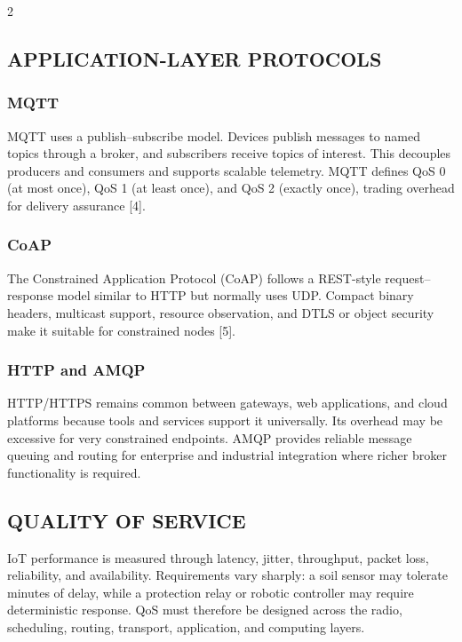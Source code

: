 \begin{multicols}{2}

  \subsection*{\centering\uppercase{Application-Layer Protocols}}
  \subsubsection*{MQTT}
  MQTT uses a publish--subscribe model. Devices publish messages to named topics through a broker, and subscribers receive topics of interest. This decouples producers and consumers and supports scalable telemetry. MQTT defines QoS 0 (at most once), QoS 1 (at least once), and QoS 2 (exactly once), trading overhead for delivery assurance [4].

  \subsubsection*{CoAP}
  The Constrained Application Protocol (CoAP) follows a REST-style request--response model similar to HTTP but normally uses UDP. Compact binary headers, multicast support, resource observation, and DTLS or object security make it suitable for constrained nodes [5].

  \subsubsection*{HTTP and AMQP}
  HTTP/HTTPS remains common between gateways, web applications, and cloud platforms because tools and services support it universally. Its overhead may be excessive for very constrained endpoints. AMQP provides reliable message queuing and routing for enterprise and industrial integration where richer broker functionality is required.

  \subsection*{\centering\uppercase{Quality of Service}}
  IoT performance is measured through latency, jitter, throughput, packet loss, reliability, and availability. Requirements vary sharply: a soil sensor may tolerate minutes of delay, while a protection relay or robotic controller may require deterministic response. QoS must therefore be designed across the radio, scheduling, routing, transport, application, and computing layers.


\end{multicols}
